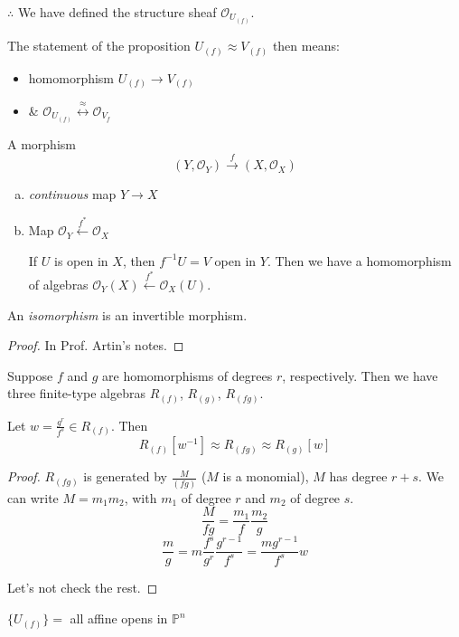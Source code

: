 \documentclass [letterpaper,11pt,twoside]{article}
\begin{document}
    $\therefore$ We have defined the structure sheaf $\mathcal O_{U_{(f)}}$.

    The statement of the proposition $U_{(f)} \approx V_{(f)}$ then means:
    \begin{itemize}
      \item homomorphism $U_{(f)} \to V_{(f)}$
      \item \& $\mathcal O_{U_{(f)}} \stackrel{\approx}{\longleftrightarrow} \mathcal
      O_{V_{f}}$
    \end{itemize}

    A morphism
    $$(Y, \mathcal O_Y) \xrightarrow{f} (X, \mathcal O_X)$$
    \begin{enumerate}[(a)]
      \item \emph{continuous} map $Y \to X$
      \item Map $\mathcal O_Y \xleftarrow{f^*} \mathcal O_X$ \par\noindent
        If $U$ is open in $X$, then $f^{-1}U = V$ open in $Y$.  Then we have a
        homomorphism of algebras $\mathcal O_Y(X) \xleftarrow{f^*} \mathcal
        O_X(U)$.
    \end{enumerate}
    An \emph{isomorphism} is an invertible morphism.

    \begin{proof}
      In Prof. Artin's notes.
    \end{proof}

    Suppose $f$ and $g$ are homomorphisms of degrees $r$, respectively.  Then
    we have three finite-type algebras $R_{(f)}$, $R_{(g)}$, $R_{(fg)}$.

    \begin{prop*}
      Let $w = \frac{g^r}{f^s} \in R_{(f)}$.  Then
      $$R_{(f)}[w^{-1}] \approx R_{(fg)} \approx R_{(g)}[w]$$
    \end{prop*}
    \begin{proof}
      $R_{(fg)}$ is generated by $\frac{M}{(fg)}$ ($M$ is a monomial), $M$ has
      degree $r + s$.  We can write $M = m_1 m_2$, with $m_1$ of degree $r$ and
      $m_2$ of degree $s$.
      $$\frac{M}{fg} = \frac{m_1}{f}\frac{m_2}{g}$$
      $$\frac{m}{g} = m \frac{f^s}{g^r} \frac{g^{r-1}}{f^s} = \frac{m
      g^{r-1}}{f^s} w$$

      Let's not check the rest.
    \end{proof}

    $\{U_{(f)}\} = $ all affine opens in $\mathbb P^n$
\end{document}

